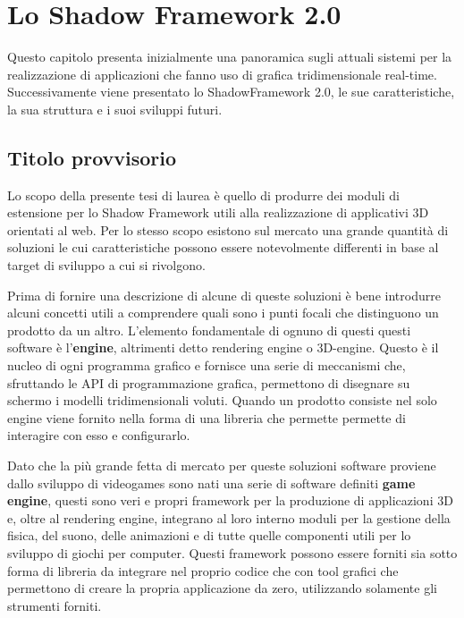
\chapter{Lo Shadow Framework 2.0}
\label{ch:shadowframework}
Questo capitolo presenta inizialmente una panoramica sugli attuali sistemi per la realizzazione di applicazioni che fanno uso di grafica tridimensionale real-time. Successivamente viene presentato lo ShadowFramework 2.0, le sue caratteristiche, la sua struttura e i suoi sviluppi futuri.


\section{Titolo provvisorio}
\label{sec:titolo_provvisorio}
Lo scopo della presente tesi di laurea \`e quello di produrre dei moduli di estensione per lo Shadow Framework utili alla realizzazione di applicativi 3D orientati al web. 
Per lo stesso scopo esistono sul mercato una grande quantit\`a di soluzioni le cui caratteristiche possono essere notevolmente differenti in base al target di sviluppo a cui si rivolgono.

Prima di fornire una descrizione di alcune di queste soluzioni \`e bene introdurre alcuni concetti utili a comprendere quali sono i punti focali che distinguono un prodotto da un altro. L'elemento fondamentale di ognuno di questi questi software \`e l'\textbf{engine}, altrimenti detto rendering engine o 3D-engine. Questo \`e il nucleo di ogni programma grafico e fornisce una serie di meccanismi che, sfruttando le \ac{API} di programmazione grafica, permettono di disegnare su schermo i modelli tridimensionali voluti. Quando un prodotto consiste nel solo engine viene fornito nella forma di una libreria che permette permette di interagire con esso e configurarlo.

Dato che la pi\`u grande fetta di mercato per queste soluzioni software proviene dallo sviluppo di videogames sono nati una serie di software definiti \textbf{game engine}, questi sono veri e propri framework per la produzione di applicazioni 3D e, oltre al rendering engine, integrano al loro interno moduli per la gestione della fisica, del suono, delle animazioni e di tutte quelle componenti utili per lo sviluppo di giochi per computer. Questi framework possono essere forniti sia sotto forma di libreria da integrare nel proprio codice che con tool grafici che permettono di creare la propria applicazione da zero, utilizzando solamente gli strumenti forniti.

